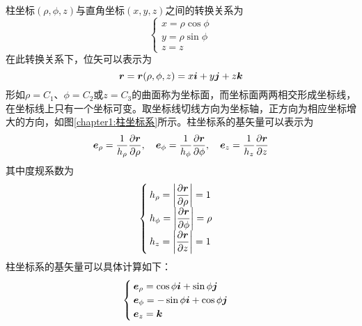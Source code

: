 柱坐标$(\rho,\phi,z)$与直角坐标$(x,y,z)$之间的转换关系为
\begin{equation}
	\begin{cases}
		x = \rho \cos \phi \\
		y = \rho \sin \phi \\
		z = z
	\end{cases}
\end{equation}
在此转换关系下，位矢可以表示为
\begin{equation}
	\boldsymbol{r} = \boldsymbol{r}(\rho,\phi,z) = x\boldsymbol{i} + y\boldsymbol{j} + z\boldsymbol{k}
\end{equation}
形如$\rho = C_1$、$\phi = C_2$或$z = C_3$的曲面称为{\heiti 坐标面}，而坐标面两两相交形成{\heiti 坐标线}，在坐标线上只有一个坐标可变。取坐标线切线方向为坐标轴，正方向为相应坐标增大的方向，如图\ref{chapter1:柱坐标系}所示。柱坐标系的基矢量可以表示为
\begin{equation}
	\boldsymbol{e}_\rho = \frac{1}{h_\rho} \frac{\partial \boldsymbol{r}}{\partial \rho},\quad \boldsymbol{e}_\phi = \frac{1}{h_\phi} \frac{\partial \boldsymbol{r}}{\partial \phi},\quad \boldsymbol{e}_z = \frac{1}{h_z} \frac{\partial \boldsymbol{r}}{\partial z}
\end{equation}
其中度规系数为
\begin{equation}
	\begin{cases}
		h_\rho = \left|\dfrac{\partial \boldsymbol{r}}{\partial \rho}\right| = 1 \\
		h_\phi = \left|\dfrac{\partial \boldsymbol{r}}{\partial \phi}\right| = \rho \\
		h_z = \left|\dfrac{\partial \boldsymbol{r}}{\partial z}\right| = 1
	\end{cases}
\end{equation}
柱坐标系的基矢量可以具体计算如下：
\begin{equation}
	\begin{cases}
		\boldsymbol{e}_\rho = \cos \phi \boldsymbol{i} + \sin \phi \boldsymbol{j} \\
		\boldsymbol{e}_\phi = -\sin \phi \boldsymbol{i} + \cos \phi \boldsymbol{j} \\
		\boldsymbol{e}_z = \boldsymbol{k}
	\end{cases}
\end{equation}

